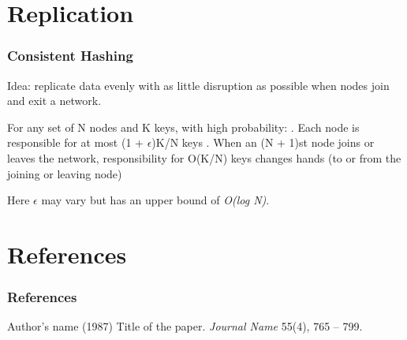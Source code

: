 \documentclass{beamer}
\begin{document}
\section{Replication}
\begin{frame}
\frametitle{Consistent Hashing}
Idea: replicate data evenly with as little disruption
as possible when nodes join and exit a network. \\
\begin{theorem}
For any set of N nodes and K keys, with high probability:
\newline{}. Each node is responsible for at most (1 + $\epsilon$)K/N keys
\newline{}. When an (N + 1)st node joins or leaves the network,
   responsibility for O(K/N) keys changes hands (to or from
   the joining or leaving node)
\end{theorem}
Here $\epsilon$ may vary but has an upper bound of \textit{O(log N)}.
\end{frame}
%
%
%
%
%
%
\section{References}
\begin{frame}
\frametitle{References}
\footnotesize {
\begin{thebibliography}{99}
  Author's name (1987)
 \newblock Title of the paper.
 \newblock \emph{Journal Name} 55(4), 765 -- 799.
\end{thebibliography}
}
\end{frame}
%
\end{document}
